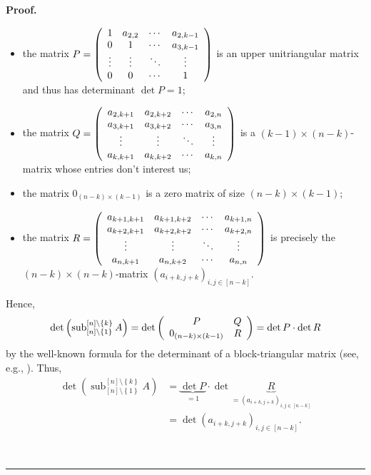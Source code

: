 \documentclass[numbers=enddot,12pt,final,onecolumn,notitlepage]{scrartcl}%
\theoremstyle{definition}
\newenvironment{proof}[1][Proof]{\noindent\textbf{#1.} }{\ \rule{0.5em}{0.5em}}
\begin{document}
\begin{enumerate}
\begin{proof}
\begin{itemize}
\item the matrix $P=\left(
\begin{array}
[c]{cccc}%
1 & a_{2,2} & \cdots & a_{2,k-1}\\
0 & 1 & \cdots & a_{3,k-1}\\
\vdots & \vdots & \ddots & \vdots\\
0 & 0 & \cdots & 1
\end{array}
\right)  $ is an upper unitriangular matrix and thus has determinant $\det
P=1$;

\item the matrix $Q=\left(
\begin{array}
[c]{cccc}%
a_{2,k+1} & a_{2,k+2} & \cdots & a_{2,n}\\
a_{3,k+1} & a_{3,k+2} & \cdots & a_{3,n}\\
\vdots & \vdots & \ddots & \vdots\\
a_{k,k+1} & a_{k,k+2} & \cdots & a_{k,n}%
\end{array}
\right)  $ is a $\left(  k-1\right)  \times\left(  n-k\right)  $-matrix whose
entries don't interest us;

\item the matrix $0_{\left(  n-k\right)  \times\left(  k-1\right)  }$ is a
zero matrix of size $\left(  n-k\right)  \times\left(  k-1\right)  $;

\item the matrix $R=\left(
\begin{array}
[c]{cccc}%
a_{k+1,k+1} & a_{k+1,k+2} & \cdots & a_{k+1,n}\\
a_{k+2,k+1} & a_{k+2,k+2} & \cdots & a_{k+2,n}\\
\vdots & \vdots & \ddots & \vdots\\
a_{n,k+1} & a_{n,k+2} & \cdots & a_{n,n}%
\end{array}
\right)  $ is precisely the $\left(  n-k\right)  \times\left(  n-k\right)
$-matrix $\left(  a_{i+k,j+k}\right)  _{i,j\in\left[  n-k\right]  }$.
\end{itemize}

Hence,%
\[
\det\left(  \operatorname*{sub}\nolimits_{\left[  n\right]  \setminus\left\{
1\right\}  }^{\left[  n\right]  \setminus\left\{  k\right\}  }A\right)
=\det\left(
\begin{array}
[c]{cc}%
P & Q\\
0_{\left(  n-k\right)  \times\left(  k-1\right)  } & R
\end{array}
\right)  =\det P\cdot\det R
\]
by the well-known formula for the determinant of a block-triangular matrix
(see, e.g., \cite[Exercise 6.29]{detnotes}). Thus,%
\begin{align}
\det\left(  \operatorname*{sub}\nolimits_{\left[  n\right]  \setminus\left\{
1\right\}  }^{\left[  n\right]  \setminus\left\{  k\right\}  }A\right)   &
=\underbrace{\det P}_{=1}\cdot\det\underbrace{R}_{=\left(  a_{i+k,j+k}\right)
_{i,j\in\left[  n-k\right]  }}\nonumber\\
&  =\det\left(  a_{i+k,j+k}\right)  _{i,j\in\left[  n-k\right]  }.
\label{pf.lem.36.det-hess.7}%
\end{align}



\end{proof}
\end{enumerate}
\end{document}
